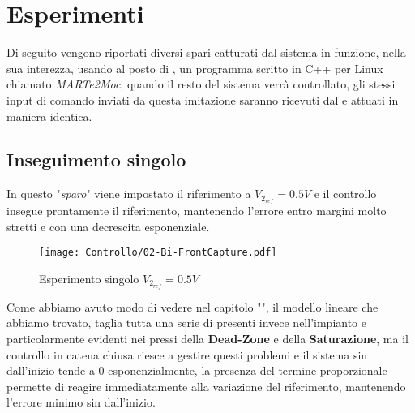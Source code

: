 
\section{Esperimenti}
Di seguito vengono riportati diversi spari catturati dal sistema in funzione, nella sua interezza, usando al posto di \MARTe, un programma scritto in C++ per Linux chiamato \textit{MARTe2Moc}, quando il resto del sistema verrà controllato, gli stessi input di comando inviati da questa imitazione saranno ricevuti dal \microControllore e attuati in maniera identica.

\subsection{Inseguimento singolo}
In questo "\textit{sparo}" viene impostato il riferimento a $ V_{2_{ref}}=0.5V $ e il controllo insegue prontamente il riferimento, mantenendo l'errore entro margini molto stretti e con una decrescita esponenziale.\vspace{-2mm}
\begin{figure}[H]
	\centering
	\caption[Esperimento singolo $ V_{2_{ref}}=0.5V $]{Esperimento singolo $ V_{2_{ref}}=0.5V $}
	\texttt{[image: Controllo/02-Bi-FrontCapture.pdf]}
\end{figure}\vspace{-8mm}
\noindent
Come abbiamo avuto modo di vedere nel capitolo "", il modello lineare che abbiamo trovato, taglia tutta una serie di \nonLinearita presenti invece nell'impianto e particolarmente evidenti nei pressi della \textbf{Dead-Zone} e della \textbf{Saturazione}, ma il controllo in catena chiusa riesce a gestire questi problemi e il sistema sin dall'inizio tende a 0 esponenzialmente, la presenza del termine proporzionale permette di reagire immediatamente alla variazione del riferimento, mantenendo l'errore minimo sin dall'inizio.

